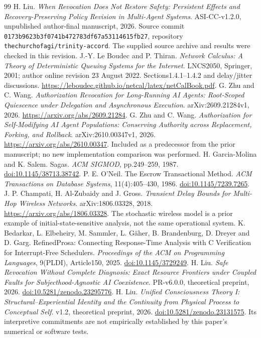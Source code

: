 \FloatBarrier
\begin{thebibliography}{99}\fontsize{9.5}{11}\selectfont\setlength{\itemsep}{2pt}\setlength{\parskip}{0pt}
 H. Liu. \emph{When Revocation Does Not Restore Safety: Persistent Effects and Recovery-Preserving Policy Revision in Multi-Agent Systems}. ASI-CC-v1.2.0, unpublished author-final manuscript, 2026. Source commit \nolinkurl{0173b9623b3f0741b472783df67a53114615fb27}, repository \texttt{thechurchofagi/trinity-accord}. The supplied source archive and results were checked in this revision.
 J.-Y. Le Boudec and P. Thiran. \emph{Network Calculus: A Theory of Deterministic Queuing Systems for the Internet}. LNCS2050, Springer, 2001; author online revision 23 August 2022. Sections1.4.1--1.4.2 and delay/jitter discussions. \url{https://leboudec.github.io/netcal/latex/netCalBook.pdf}.
 G. Zhu and C. Wang. \emph{Authorization Revocation for Long-Running AI Agents: Root-Scoped Quiescence under Delegation and Asynchronous Execution}. arXiv:2609.21284v1, 2026. \url{https://arxiv.org/abs/2609.21284}.
 G. Zhu and C. Wang. \emph{Authorization for Self-Modifying AI Agent Populations: Conserving Authority across Replacement, Forking, and Rollback}. arXiv:2610.00347v1, 2026. \url{https://arxiv.org/abs/2610.00347}. Included as a predecessor from the prior manuscript; no new implementation comparison was performed.
 H. Garcia-Molina and K. Salem. Sagas. \emph{ACM SIGMOD}, pp.249--259, 1987. \href{https://doi.org/10.1145/38713.38742}{doi:10.1145/38713.38742}.
 P. E. O'Neil. The Escrow Transactional Method. \emph{ACM Transactions on Database Systems}, 11(4):405--430, 1986. \href{https://doi.org/10.1145/7239.7265}{doi:10.1145/7239.7265}.
 J. P. Champati, H. Al-Zubaidy and J. Gross. \emph{Transient Delay Bounds for Multi-Hop Wireless Networks}. arXiv:1806.03328, 2018. \url{https://arxiv.org/abs/1806.03328}. The stochastic wireless model is a prior example of initial-state-sensitive analysis, not the same operational system.
 K. Bedarkar, L. Elbeheiry, M. Sammler, L. G\"aher, B. Brandenburg, D. Dreyer and D. Garg. RefinedProsa: Connecting Response-Time Analysis with C Verification for Interrupt-Free Schedulers. \emph{Proceedings of the ACM on Programming Languages}, 9(PLDI), Article150, 2025. \href{https://doi.org/10.1145/3729249}{doi:10.1145/3729249}.
 H. Liu. \emph{Safe Revocation Without Complete Diagnosis: Exact Resource Frontiers under Coupled Faults for Subjecthood-Agnostic AI Coexistence}. PR-v6.0.0, theoretical preprint, 2026. \href{https://doi.org/10.5281/zenodo.23295776}{doi:10.5281/zenodo.23295776}.
 H. Liu. \emph{Unified Consciousness Theory I: Structural--Experiential Identity and the Continuity from Physical Process to Conceptual Self}. v1.2, theoretical preprint, 2026. \href{https://doi.org/10.5281/zenodo.23131575}{doi:10.5281/zenodo.23131575}. Its interpretive commitments are not empirically established by this paper's numerical or software tests.
\end{thebibliography}


